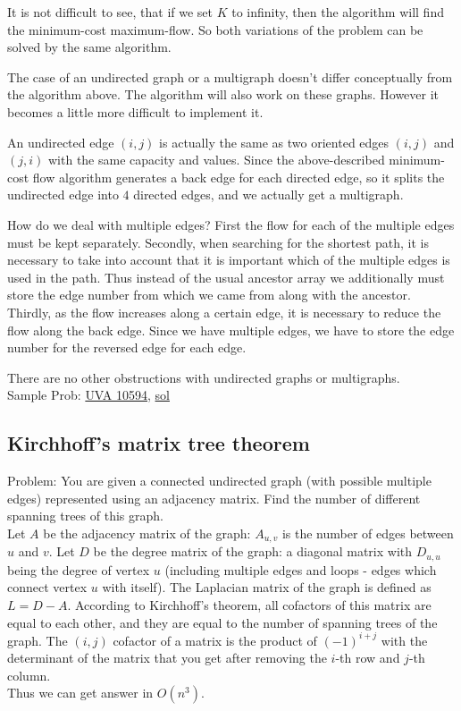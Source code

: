 \documentclass[8pt, a4paper, oneside, twocolumn]{extarticle}
\begin{document}
It is not difficult to see, that if we set $K$ to infinity, then the algorithm will find the minimum-cost maximum-flow. So both variations of the problem can be solved by the same algorithm.

The case of an undirected graph or a multigraph doesn't differ conceptually from the algorithm above. The algorithm will also work on these graphs. However it becomes a little more difficult to implement it.

An undirected edge $(i, j)$ is actually the same as two oriented edges $(i, j)$ and $(j, i)$ with the same capacity and values. Since the above-described minimum-cost flow algorithm generates a back edge for each directed edge, so it splits the undirected edge into $4$ directed edges, and we actually get a multigraph.

How do we deal with multiple edges? First the flow for each of the multiple edges must be kept separately. Secondly, when searching for the shortest path, it is necessary to take into account that it is important which of the multiple edges is used in the path. Thus instead of the usual ancestor array we additionally must store the edge number from which we came from along with the ancestor. Thirdly, as the flow increases along a certain edge, it is necessary to reduce the flow along the back edge. Since we have multiple edges, we have to store the edge number for the reversed edge for each edge.

There are no other obstructions with undirected graphs or multigraphs.
\\Sample Prob: \href{https://uva.onlinejudge.org/external/105/10594.pdf}{UVA 10594}, \href{https://github.com/sourabhxyz/Competitive-Programming/blob/master/UVA_10594_Better.cpp}{sol}
\subsection{Kirchhoff's matrix tree theorem}
Problem: You are given a connected undirected graph (with possible multiple edges) represented using an adjacency matrix. Find the number of different spanning trees of this graph.
\\Let $A$ be the adjacency matrix of the graph: $A_{u,v}$ is the number of edges between $u$ and $v$. Let $D$ be the degree matrix of the graph: a diagonal matrix with $D_{u,u}$ being the degree of vertex $u$ (including multiple edges and loops - edges which connect vertex $u$ with itself).
The Laplacian matrix of the graph is defined as $L = D - A$. According to Kirchhoff's theorem, all cofactors of this matrix are equal to each other, and they are equal to the number of spanning trees of the graph. The $(i,j)$ cofactor of a matrix is the product of $(-1)^{i + j}$ with the determinant of the matrix that you get after removing the $i$-th row and $j$-th column.\\ Thus we can get answer in $O(n^3)$.
\end{document}
